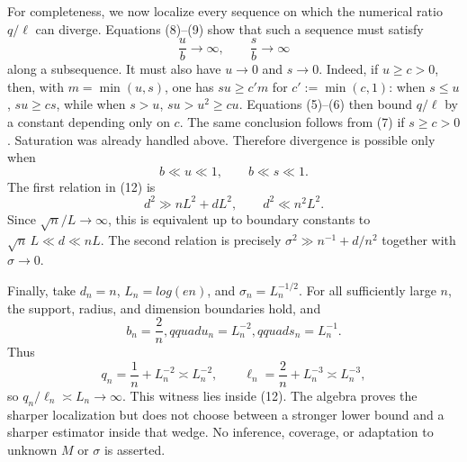 For completeness, we now localize every sequence on which the numerical ratio \(q/\ell\) can diverge.  Equations (8)--(9) show that such a sequence must satisfy
\[
 \frac ub\longrightarrow\infty,
 \qquad
 \frac sb\longrightarrow\infty
\tag{11}
\]
along a subsequence.  It must also have \(u\to0\) and \(s\to0\).  Indeed, if \(u\ge c>0\), then, with \(m=\min(u,s)\), one has \(su\ge c' m\) for \(c':=\min(c,1)\): when \(s\le u\), \(su\ge cs\), while when \(s>u\), \(su>u^2\ge cu\).  Equations (5)--(6) then bound \(q/\ell\) by a constant depending only on \(c\).  The same conclusion follows from (7) if \(s\ge c>0\).  Saturation was already handled above.  Therefore divergence is possible only when
\[
 b\ll u\ll1,
 \qquad b\ll s\ll1.
\tag{12}
\]
The first relation in (12) is
\[
 d^2\gg nL^2+dL^2,
 \qquad d^2\ll n^2L^2.
\]
Since \(\sqrt n/L\to\infty\), this is equivalent up to boundary constants to \(\sqrt n\,L\ll d\ll nL\).  The second relation is precisely \(\sigma^2\gg n^{-1}+d/n^2\) together with \(\sigma\to0\).

Finally, take \(d_n=n\), \(L_n=log(en)\), and \(\sigma_n=L_n^{-1/2}\).  For all sufficiently large \(n\), the support, radius, and dimension boundaries hold, and
\[
 b_n=\frac2n,qquad u_n=L_n^{-2},qquad s_n=L_n^{-1}.
\]
Thus
\[
 q_n=\frac1n+L_n^{-2}\asymp L_n^{-2},
 \qquad
 \ell_n=\frac2n+L_n^{-3}\asymp L_n^{-3},
\]
so \(q_n/\ell_n\asymp L_n\to\infty\).  This witness lies inside (12).  The algebra proves the sharper localization but does not choose between a stronger lower bound and a sharper estimator inside that wedge.  No inference, coverage, or adaptation to unknown \(M\) or \(\sigma\) is asserted.